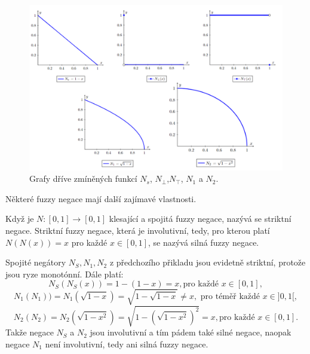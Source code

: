 \begin{example}
            \begin{figure}[H]
            \caption{ Grafy dříve zmíněných funkcí $N_s$, $N_{\bot}$,$ N_{\top}$, $N_1$ a $N_2.$\\}
                \includegraphics[scale=0.56]{template-fig/negace.pdf}
                \centering
            \end{figure}

    \end{example}

   N\v ekter\'e fuzzy negace maj\'i dal\v s\'i zaj\'imav\'e vlastnosti. 

    \begin{definition}
    \cite{Kolo}
        Kdy\v z je $N: [0,1] \to [0,1]$ klesající a spojitá fuzzy negace, nazývá se striktní negace.
        Striktn\'i fuzzy negace, kter\'a je involutivní, tedy, pro kterou plat\'i $N(N(x)) = x $ pro každé $ x \in [0,1]$, se nazývá silná fuzzy negace.
    \end{definition}

    \begin{example}
        Spojit\'e neg\'atory $N_S, N_1, N_2$ z p\v redchoz\'iho p\v rikladu jsou evidetn\v e striktn\'i, proto\v ze jsou ryze monot\'onn\'i. D\'ale plat\'i:
        $$N_S(N_S(x))=1-(1-x)=x, \mbox{pro ka\v zd\'e } x \in [0,1],$$
                $$N_1(N_1)) = N_1(\sqrt{1-x}) = \sqrt{1-\sqrt{1-x}} \neq x, \mbox{ pro t\'em\v e\v r každé } x \in ]0,1[,$$ $$N_2(N_2) = N_2(\sqrt{1-x^2}) = \sqrt{1-(\sqrt{1-x^2})^2} = x,
                \mbox{pro každé } x \in [0,1].$$
Takže negace $N_S$ a $N_2$ jsou involutivní a tím pádem tak\'e siln\'e negace, naopak
            negace $N_1$ není involutivní, tedy ani siln\'a fuzzy negace.
                
            \end{example}

